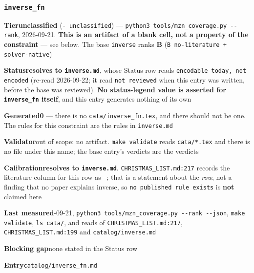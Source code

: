 \documentclass[10pt,a4paper]{article}
\newcommand{\entryfield}[2]{{\raggedright\textbf{#1}\quad #2\par}}
\begin{document}
\subsubsection*{\texttt{inverse\_\allowbreak{}fn}}
\label{entry:inverse-fn}
\entryfield{Tier}{\textbf{unclassified} (\texttt{- unclassified}) --- \texttt{python3 tools/\allowbreak{}mzn\_\allowbreak{}coverage.\allowbreak{}py -\allowbreak{}-\allowbreak{}rank}, 2026-09-21. \textbf{This is an artifact of a blank cell, not a property of the constraint} --- see below. The base \texttt{inverse} ranks \textbf{B} (\texttt{B no-\allowbreak{}literature + solver-\allowbreak{}native})}
\entryfield{Status}{\textbf{resolves to \texttt{inverse.md}}, whose Status row reads \texttt{encodable today, not encoded} (re-read 2026-09-22; it read \texttt{not reviewed} when this entry was written, before the base was reviewed). \textbf{No status-legend value is asserted for \texttt{inverse\_fn} itself}, and this entry generates nothing of its own}
\entryfield{Generated}{\textbf{0} --- there is no \texttt{cata/inverse\_fn.tex}, and there should not be one. The rules for this constraint are the rules in \texttt{inverse.md}}
\entryfield{Validator}{out of scope: no artifact. \texttt{make validate} reads \texttt{cata/*.tex} and there is no file under this name; the base entry's verdicts are the verdicts}
\entryfield{Calibration}{\textbf{resolves to \texttt{inverse.md}}. \texttt{CHRISTMAS\_LIST.md:217} records the literature column for this row as \texttt{---}; that is a statement about the \emph{row}, not a finding that no paper explains inverse, so \texttt{no published rule exists} is \textbf{not} claimed here}
\entryfield{Last measured}{2026-09-21, \texttt{python3 tools/\allowbreak{}mzn\_\allowbreak{}coverage.\allowbreak{}py -\allowbreak{}-\allowbreak{}rank -\allowbreak{}-\allowbreak{}json}, \texttt{make validate}, \texttt{ls cata/}, and reads of \texttt{CHRISTMAS\_LIST.md:217}, \texttt{CHRISTMAS\_LIST.md:199} and \texttt{catalog/inverse.md}}
\entryfield{Blocking gap}{none stated in the Status row}
\entryfield{Entry}{\texttt{catalog/inverse\_fn.md}}
\end{document}
